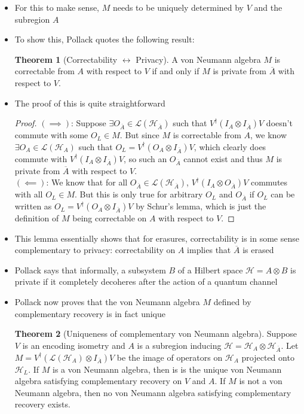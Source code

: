 \documentclass[12pt,a4paper]{article}
\numberwithin{equation}{section}
\newcommand{\ol}[1]{\overline{#1}}
\theoremstyle{definition}
\theoremstyle{theorem}
\newtheorem{theorem}{Theorem}[section]
\theoremstyle{example}
\begin{document}
\begin{itemize}
		\item For this to make sense, $M$ needs to be uniquely determined by $V$ and the subregion $A$
		\item To show this, Pollack quotes the following result:
		\begin{theorem}[Correctability $\leftrightarrow$ Privacy]
			A von Neumann algebra $M$ is correctable from $A$ with respect to $V$ if and only if $M$ is private from $\ol{A}$ with respect to $V$.
		\end{theorem}
		\item The proof of this is quite straightforward
		\begin{proof}
			$(\implies)$: Suppose $\exists O_{\ol{A}}\in \mathcal{L}(\mathcal{H}_{\ol{A}})$ such that $V^{\dagger}(I_{A}\otimes I_{\ol{A}})V$ doesn't commute with some $O_{L}\in M$. But since $M$ is correctable from $A$, we know $\exists O_{A}\in\mathcal{L}(\mathcal{H}_{A})$ such that $O_{L}=V^{\dagger}(O_{A}\otimes I_{\ol{A}})V$, which clearly does commute with $V^{\dagger}(I_{A}\otimes I_{\ol{A}})V$, so such an $O_{\ol{A}}$ cannot exist and thus $M$ is private from $\ol{A}$ with respect to $V$.\\
			$(\impliedby)$: We know that for all $O_{\ol{A}}\in\mathcal{L}(\mathcal{H}_{\ol{A}})$, $V^{\dagger}(I_{A}\otimes O_{\ol{A}})V$ commutes with all $O_{L}\in M$. But this is only true for arbitrary $O_{L}$ and $O_{\ol{A}}$ if $O_{L}$ can be written as $O_{L}=V^{\dagger}(O_{A}\otimes I_{\ol{A}})V$ by Schur's lemma, which is just the definition of $M$ being correctable on $A$ with respect to $V$.
		\end{proof}
		\item This lemma essentially shows that for erasures, correctability is in some sense complementary to privacy: correctability on $A$ implies that $\ol{A}$ is erased
		\item Pollack says that informally, a subsystem $B$ of a Hilbert space $\mathcal{H}=A\otimes B$ is private if it completely decoheres after the action of a quantum channel
		\item Pollack now proves that the von Neumann algebra $M$ defined by complementary recovery is in fact unique
		\begin{theorem}[Uniqueness of complementary von Neumann algebra]
			Suppose $V$ is an encoding isometry and $A$ is a subregion inducing $\mathcal{H}=\mathcal{H}_{A}\otimes\mathcal{H}_{\ol{A}}$. Let $M=V^{\dagger}(\mathcal{L}(\mathcal{H}_{A})\otimes I_{\ol{A}})V$ be the image of operators on $\mathcal{H}_{A}$ projected onto $\mathcal{H}_{L}$. If $M$ is a von Neumann algebra, then is is the unique von Neumann algebra satisfying complementary recovery on $V$ and $A$. If $M$ is not a von Neumann algebra, then no von Neumann algebra satisfying complementary recovery exists.

\end{theorem}
\end{itemize}
\end{document}
